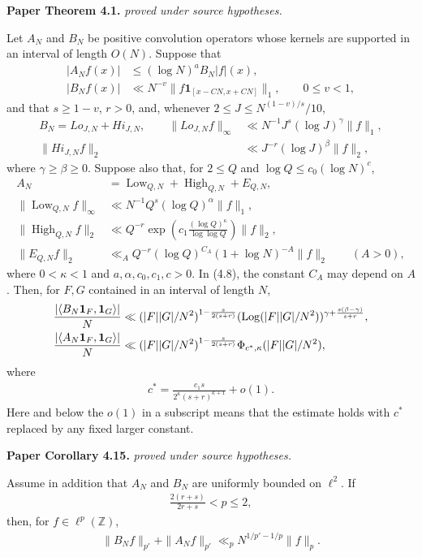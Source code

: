 \begin{theorem}
\label{abstract_improving}
\leanok
\par\medskip\noindent\textbf{Paper Theorem 4.1.} \textit{proved under source hypotheses.}\par
Let $A_N$ and $B_N$ be positive convolution operators whose kernels are
supported in an interval of length $O(N)$.  Suppose that
\begin{align}
 |A_Nf(x)|&\leq(\log N)^aB_N|f|(x),\\
 |B_Nf(x)|&\ll N^{-v}\|f\mathbf1_{[x-CN,x+CN]}\|_1,
 \qquad 0\leq v<1,
\end{align}
and that $s\geq1-v$, $r>0$, and, whenever
$2\leq J\leq N^{(1-v)/s}/10$,
\begin{align}
 B_N=Lo_{J,N}+Hi_{J,N},\qquad
 \|Lo_{J,N}f\|_\infty&\ll N^{-1}J^s(\log J)^\gamma\|f\|_1,
 \\
 \|Hi_{J,N}f\|_2&\ll J^{-r}(\log J)^\beta\|f\|_2,
\end{align}
where $\gamma\geq\beta\geq0$.  Suppose also that, for
$2\leq Q$ and $\log Q\leq c_0(\log N)^c$,
\begin{align}
 A_N&=\operatorname{Low}_{Q,N}+\operatorname{High}_{Q,N}+E_{Q,N},
 \\
 \|\operatorname{Low}_{Q,N}f\|_\infty
 &\ll N^{-1}Q^s(\log Q)^\alpha\|f\|_1,\\
 \|\operatorname{High}_{Q,N}f\|_2
 &\ll Q^{-r}\exp\left(c_1\frac{(\log Q)^\kappa}{\log\log Q}\right)\|f\|_2,
 \\
 \|E_{Q,N}f\|_2&\ll_A Q^{-r}(\log Q)^{C_A}
 (1+\log N)^{-A}\|f\|_2
 \qquad(A>0),
\end{align}
where \(0<\kappa<1\) and \(a,\alpha,c_0,c_1,c>0\).  In
\textup{(4.8)}, the constant \(C_A\) may depend on \(A\).  Then, for
$F,G$ contained in an interval of length $N$,
\begin{align}
 \frac{|\langle B_N\mathbf1_F,\mathbf1_G\rangle|}{N}
 &\ll (|F||G|/N^2)^{1-\frac{s}{2(s+r)}}
 (\operatorname{Log} (|F||G|/N^2))^{\gamma+\frac{s(\beta-\gamma)}{s+r}},\\
 \frac{|\langle A_N\mathbf1_F,\mathbf1_G\rangle|}{N}
 &\ll (|F||G|/N^2)^{1-\frac{s}{2(s+r)}}\Phi_{c^*,\kappa}(|F||G|/N^2),
\end{align}
where 
\begin{align}
 c^*=\frac{c_1s}{2^\kappa(s+r)^{\kappa+1}}+o(1).
\end{align}
Here and below the $o(1)$ in a subscript means that the estimate holds
with $c^*$ replaced by any fixed larger constant.
\par\medskip\noindent\textbf{Paper Corollary 4.15.} \textit{proved under source hypotheses.}\par
Assume in addition that $A_N$ and $B_N$ are uniformly bounded on
$\ell^2$.  If
\begin{align*}
 \frac{2(r+s)}{2r+s}<p\leq2,
\end{align*}
then, for $f\in \ell^p(\mathbb{Z})$,
\begin{align}
 \|B_Nf\|_{p'}+\|A_Nf\|_{p'}
 \ll_p N^{1/p'-1/p}\|f\|_p.
\end{align}
\end{theorem}

